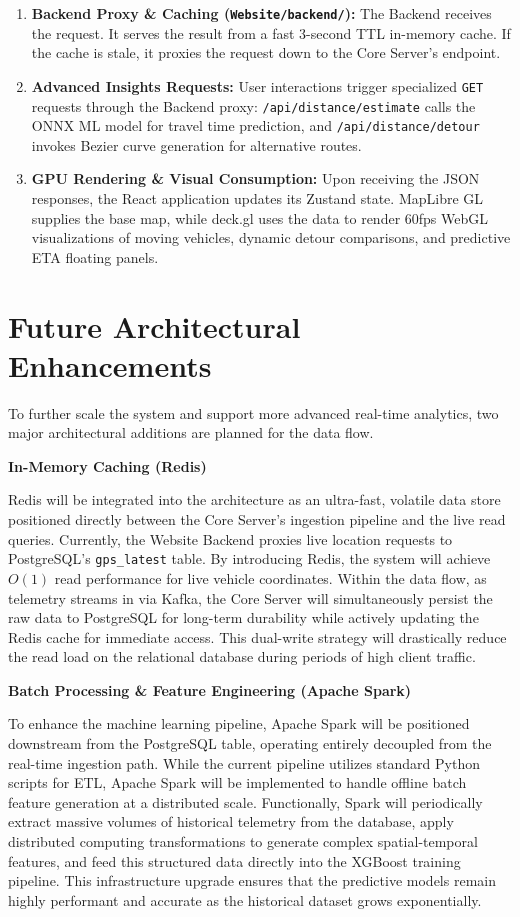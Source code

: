 \documentclass[a4paper]{article}
\begin{document}
\begin{enumerate}
    \item \textbf{Backend Proxy \& Caching (\texttt{Website/backend/}):} The Backend receives the  request. It serves the result from a fast 3-second TTL in-memory cache. If the cache is stale, it proxies the request down to the Core Server's  endpoint.
    \item \textbf{Advanced Insights Requests:} User interactions trigger specialized \texttt{GET} requests through the Backend proxy: \texttt{/api/distance/estimate} calls the ONNX ML model for travel time prediction, and \texttt{/api/distance/detour} invokes Bezier curve generation for alternative routes.
    \item \textbf{GPU Rendering \& Visual Consumption:} Upon receiving the JSON responses, the React application updates its Zustand state. MapLibre GL supplies the base map, while deck.gl uses the data to render 60fps WebGL visualizations of moving vehicles, dynamic detour comparisons, and predictive ETA floating panels.
\end{enumerate}

\section{Future Architectural Enhancements}
To further scale the system and support more advanced real-time analytics, two major architectural additions are planned for the data flow.
\medskip

\textbf{In-Memory Caching (Redis)}

Redis will be integrated into the architecture as an ultra-fast, volatile data store positioned directly between the Core Server's ingestion pipeline and the live read queries. Currently, the Website Backend proxies live location requests to PostgreSQL's \texttt{gps\_latest} table. By introducing Redis, the system will achieve $O(1)$ read performance for live vehicle coordinates. Within the data flow, as telemetry streams in via Kafka, the Core Server will simultaneously persist the raw data to PostgreSQL for long-term durability while actively updating the Redis cache for immediate access. This dual-write strategy will drastically reduce the read load on the relational database during periods of high client traffic.
\medskip

\textbf{Batch Processing \& Feature Engineering (Apache Spark)}

To enhance the machine learning pipeline, Apache Spark will be positioned downstream from the  PostgreSQL table, operating entirely decoupled from the real-time ingestion path. While the current pipeline utilizes standard Python scripts for ETL, Apache Spark will be implemented to handle offline batch feature generation at a distributed scale. Functionally, Spark will periodically extract massive volumes of historical telemetry from the database, apply distributed computing transformations to generate complex spatial-temporal features, and feed this structured data directly into the XGBoost training pipeline. This infrastructure upgrade ensures that the predictive models remain highly performant and accurate as the historical dataset grows exponentially.
\end{document}
